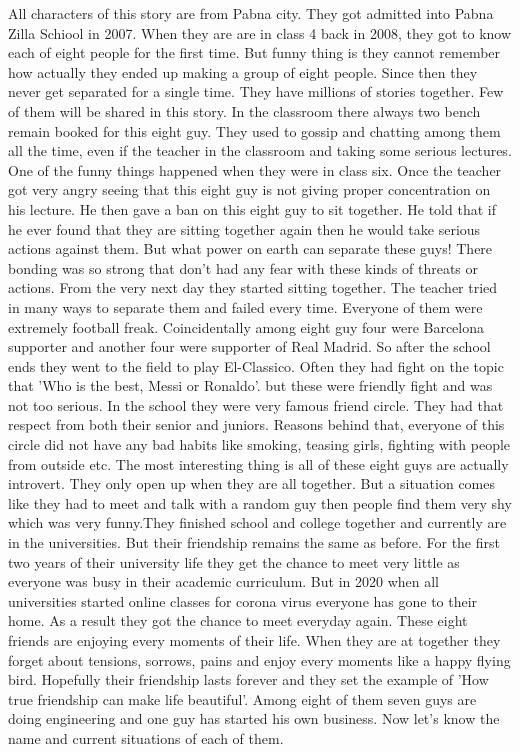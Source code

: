 \documentclass[11pt, a4paper]{article}
\begin{document}
All characters of this story are from Pabna city. They got admitted into Pabna Zilla Schiool in 2007. When they are are in class 4 back in 2008, they got to know each of eight people for the first time. But funny thing is they cannot remember how actually they ended up making a group of eight people. Since then they never get separated for a single time. They have millions of stories together. Few of them will be shared in this story. In the classroom there always two bench remain booked for this eight guy. They used to gossip and chatting among them all the time, even if the teacher in the classroom and taking some serious lectures. One of the funny things happened when they were in class six. Once the teacher got very angry seeing that this eight guy is not giving proper concentration on his lecture. He then gave a ban on this eight guy to sit together. He told that if he ever found that they are sitting together again then he would take serious actions against them. But what power on earth can separate these guys! There bonding was so strong that don't had any fear with these kinds of threats or actions. From the very next day they started sitting together. The teacher tried in many ways to separate them and failed every time. Everyone of them were extremely football freak. Coincidentally among eight guy four were Barcelona supporter and another four were supporter of Real Madrid. So after the school ends they went to the field to play El-Classico. Often they had fight on the topic that 'Who is the best, Messi or Ronaldo'. but these were friendly fight and was not too serious. In the school they were very famous friend circle. They had that respect from both their senior and juniors. Reasons behind that, everyone of this circle did not have any bad habits like smoking, teasing girls, fighting with people from outside etc. The most interesting thing is all of these eight guys are actually introvert. They only open up when they are all together. But a situation comes like they had to meet and talk with a random guy then people find them very shy which was very funny.They finished school and college together and currently are in the universities. But their friendship remains the same as before. For the first two years of their university life they get the chance to meet very little as everyone was busy in their academic curriculum. But in 2020 when all universities started online classes for corona virus everyone has gone to their home. As a result they got the chance to meet everyday again. These eight friends are enjoying every moments of their life. When they are at together they forget about tensions, sorrows, pains and enjoy every moments like a happy flying bird. Hopefully their friendship lasts forever and they set the example of 'How true friendship can make life beautiful'. Among eight of them seven guys are doing engineering and one guy has started his own business. Now let's know the name and current situations of each of them.
\end{document}
